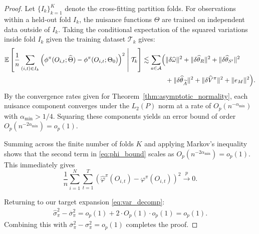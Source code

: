 \documentclass[12pt]{article}
\newcommand{\0}{\boldsymbol{0}}
\newcommand{\E}{\mathbb{E}}
\begin{document}
\begin{proof}
Let $\{I_k\}_{k=1}^K$ denote the cross-fitting partition folds. For observations within a held-out fold $I_k$, the nuisance functions $\widehat{\Theta}$ are trained on independent data outside of $I_k$. Taking the conditional expectation of the squared variations inside fold $I_k$ given the training dataset $\mathcal{T}_k$ gives:
\begin{align*}
\E \left[ \frac{1}{n} \sum_{(i,t) \in I_k} \left( \phi^\pi(O_{i,t}; \widehat{\Theta}) - \phi^\pi(O_{i,t}; \Theta_0) \right)^2 \;\middle|\; \mathcal{T}_k \right] \lesssim \sum_{a \in \mathcal{A}} \Bigl( & \|\delta \widehat{\omega}\|^2 + \|\delta \widehat{\theta}_R\|^2 + \|\delta \widehat{\theta}_{S'}\|^2 \\
& + \|\delta \widehat{\theta}_{\widetilde{A}}\|^2 + \|\delta \widehat{V}^\pi\|^2 + \|e_M\|^2 \Bigr).
\end{align*}
By the convergence rates given for Theorem~\ref{thm:asymptotic_normality}, each nuisance component converges under the $L_2(P)$ norm at a rate of $O_p(n^{-\alpha_{\min}})$ with $\alpha_{\min} > 1/4$. Squaring these components yields an error bound of order $O_p(n^{-2\alpha_{\min}}) = o_p(1)$. 

Summing across the finite number of folds $K$ and applying Markov's inequality shows that the second term in \eqref{eq:phi_bound} scales as $O_p(n^{-2\alpha_{\min}}) = o_p(1)$. This immediately gives $$\frac{1}{n}\sum_{i=1}^N\sum_{t=1}^T \left( \widehat{\varphi}^\pi(O_{i,t}) - \varphi^\pi(O_{i,t}) \right)^2 \xrightarrow{p} 0.$$

Returning to our target expansion \eqref{eq:var_decomp}:
\begin{align*}
\widehat{\sigma}_\pi^2 - \overline{\sigma}_\pi^2 = o_p(1) + 2 \cdot O_p(1) \cdot o_p(1) = o_p(1).
\end{align*}
Combining this with $\overline{\sigma}_\pi^2 -\sigma_\pi^2=o_p(1)$ completes the proof.
\end{proof}



\end{document}
